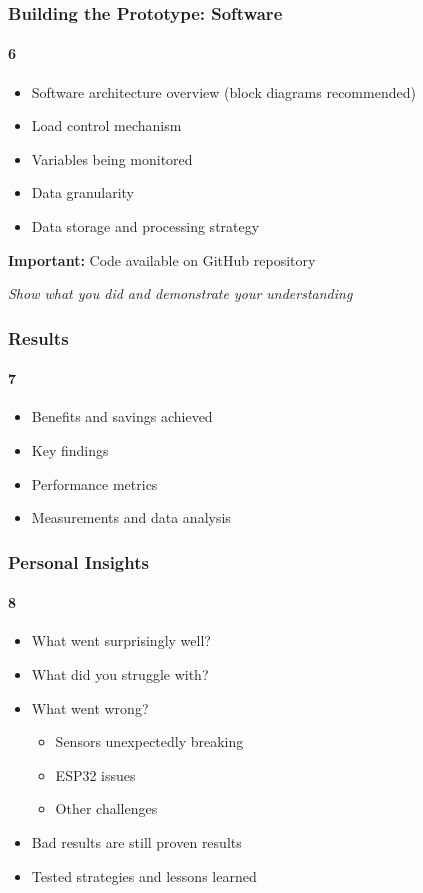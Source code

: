 \documentclass{beamer}
\begin{document}
\begin{frame}
  \frametitle{Building the Prototype: Software}
  \framesubtitle{6}
  
  \begin{itemize}
    \item Software architecture overview (block diagrams recommended)
    \item Load control mechanism
    \item Variables being monitored
    \item Data granularity
    \item Data storage and processing strategy
  \end{itemize}
  
  \vspace*{1cm}
  \textbf{Important:} Code available on GitHub repository
  
  \textit{Show what you did and demonstrate your understanding}
\end{frame}

\begin{frame}
  \frametitle{Results}
  \framesubtitle{7}
  
  \begin{itemize}
    \item Benefits and savings achieved
    \item Key findings
    \item Performance metrics
    \item Measurements and data analysis
  \end{itemize}
  
  \vspace*{1.5cm}
\end{frame}

\begin{frame}
  \frametitle{Personal Insights}
  \framesubtitle{8}
  
  \begin{itemize}
    \item What went surprisingly well?
    \item What did you struggle with?
    \item What went wrong?
      \begin{itemize}
        \item Sensors unexpectedly breaking
        \item ESP32 issues
        \item Other challenges
      \end{itemize}
    \item Bad results are still proven results
    \item Tested strategies and lessons learned
  \end{itemize}
\end{frame}
\end{document}
